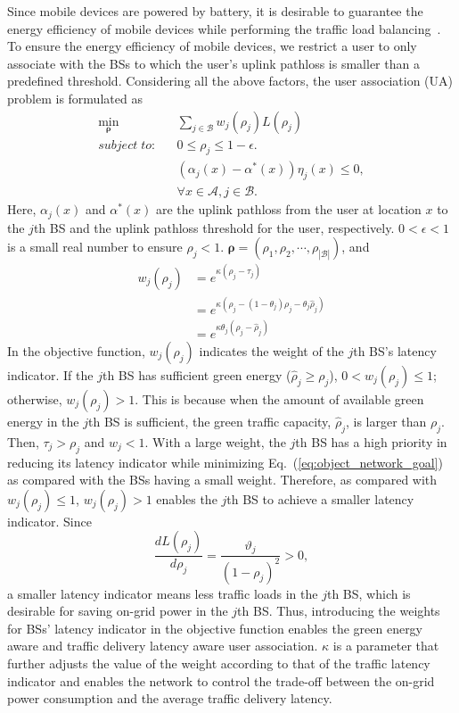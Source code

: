 \documentclass[journal]{IEEEtran}
\theoremstyle{definition}
\begin{document}
Since mobile devices are powered by battery, it is desirable to guarantee the energy efficiency of mobile devices while performing the traffic load balancing~\cite{Raj:2013:EAM}. To ensure the energy efficiency of mobile devices, we restrict a user to only associate with the BSs to which the user's uplink pathloss is smaller than a predefined threshold.
Considering all the above factors, the user association (UA) problem is formulated as
\begin{eqnarray}
\label{eq:object_network_goal}
\min_{\boldsymbol{\rho}} && \sum_{j \in \mathcal{B}}w_{j}(\rho_{j})L(\rho_{j})\\
\label{eq:constraint_omge}
subject\; to: && 0\leq\rho_{j}\leq 1-\epsilon. \nonumber\\
&& (\alpha_{j}(x)-\alpha^{*}(x))\eta_{j}(x)\leq 0,\nonumber\\
&& \forall x \in \mathcal{A},j \in \mathcal{B} .
\end{eqnarray}
Here, $\alpha_{j}(x)$ and $\alpha^{*}(x)$ are the uplink pathloss from the user at location $x$ to the $j$th BS and the uplink pathloss threshold for the user, respectively. $0<\epsilon<1$ is a small real number to ensure $\rho_{j}<1$. $\boldsymbol{\rho}=(\rho_{1}, \rho_{2}, \cdots, \rho_{|\mathcal{B}|})$, and \begin{align}
\label{eq:latency_weight}
w_{j}(\rho_{j})&=e^{\kappa(\rho_{j}-\tau_{j})}\nonumber\\
&=e^{\kappa(\rho_{j}-(1-\theta_{j})\rho_{j}-\theta_{j}\hat{\rho}_{j})}\nonumber\\
&=e^{\kappa\theta_{j}(\rho_{j}-\hat{\rho}_{j})}
\end{align}
In the objective function, $w_{j}(\rho_{j})$ indicates the weight of the $j$th BS's latency indicator. If the $j$th BS has sufficient green energy ($\hat{\rho}_{j}\geq\rho_{j}$), ${0<w_{j}(\rho_{j})\leq 1}$; otherwise, $w_{j}(\rho_{j})>1$. This is because when the amount of available green energy in the $j$th BS is sufficient, the green traffic capacity, $\hat{\rho}_{j}$, is larger than $\rho_{j}$. Then, $\tau_{j}>\rho_{j}$ and $w_{j}<1$. With a large weight, the $j$th BS has a high priority in reducing its latency indicator while minimizing Eq.~(\ref{eq:object_network_goal}) as compared with the BSs having a small weight. Therefore, as compared with $w_{j}(\rho_{j})\leq 1$, $w_{j}(\rho_{j})>1$ enables the $j$th BS to achieve a smaller latency indicator.
Since
\begin{equation}
\label{eq:deritive_L}
\frac{dL(\rho_{j})}{d\rho_{j}}=\frac{\vartheta_{j}}{(1-\rho_{j})^2}>0,
\end{equation}
a smaller latency indicator means less traffic loads in the $j$th BS, which is desirable for saving on-grid power in the $j$th BS. Thus, introducing the weights for BSs' latency indicator in the objective function enables the green energy aware and traffic delivery latency aware user association. $\kappa$ is a parameter that further adjusts the value of the weight according to that of the traffic latency indicator and enables the network to control the trade-off between the on-grid power consumption and the average traffic delivery latency.
\end{document}
